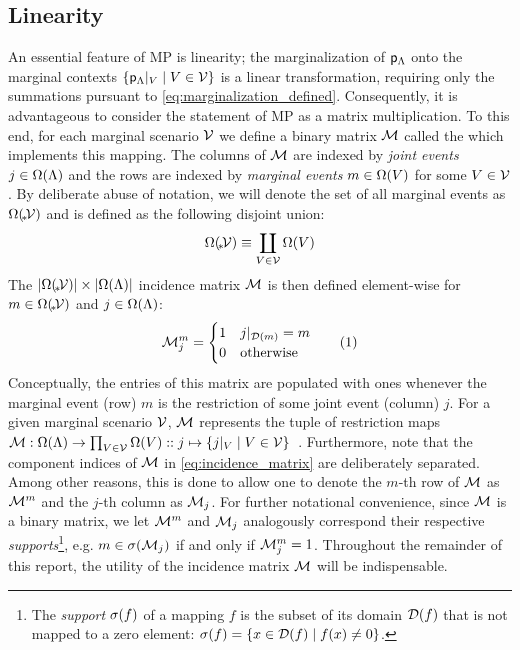 \documentclass[aps, 10pt, english, twoside, twocolumn, pra, nofootinbib, tightenlines, longbibliography, superscriptaddress]{revtex4-1}
\begin{document}
    \subsection{Linearity}
    An essential feature of MP is linearity; the marginalization of ${\mathsf{p}}_{\Lambda}$ onto the marginal contexts $\bc{\restrict{\prob{\jointvar}}{V} \mid V \in \mscenario}$ is a linear transformation, requiring only the summations pursuant to \cref{eq:marginalization_defined}. Consequently, it is advantageous to consider the statement of MP as a matrix multiplication. To this end, for each marginal scenario $\mathcal{V}$ we define a binary matrix $\mathcal{M}$ called the  which implements this mapping. The columns of $\mathcal{M}$ are indexed by \textit{joint events} $j \in \events{\jointvar}$ and the rows are indexed by \textit{marginal events} $m \in \events{V}$ for some $V \in \mathcal{V}$. By deliberate abuse of notation, we will denote the set of all marginal events as $\events{\mscenariowrap}$ and is defined as the following disjoint union:
    \[ \events{\mscenariowrap} \defined \coprod_{V \in \mscenario} \events{V} \]
    The $\abs{\events{\mscenariowrap}}\times\abs{\events{\jointvar}}$ incidence matrix $\mathcal{M}$ is then defined element-wise for $m \in \events{\mscenariowrap}$ and $j \in \events{\jointvar}$:
    \[ \incidence^{m}_{j} = \begin{cases}
        1 & \restrict{j}{\domain{m}} = m\\
        0 & \text{otherwise}
    \end{cases} \eq \label{eq:incidence_matrix} \]
    Conceptually, the entries of this matrix are populated with ones whenever the marginal event (row) $m$ is the restriction of some joint event (column) $j$. For a given marginal scenario $\mathcal{V}$, $\mathcal{M}$ represents the tuple of restriction maps $\incidence : \events{\jointvar} \to \prod_{V \in \mscenario} \events{V} :: j \mapsto \bc{\restrict{j}{V} \mid V \in \mscenario}$~\cite{Abramsky_2011}. Furthermore, note that the component indices of $\mathcal{M}$ in \cref{eq:incidence_matrix} are deliberately separated. Among other reasons, this is done to allow one to denote the $m$-th row of $\mathcal{M}$ as $\mathcal{M}^{m}$ and the $j$-th column as $\mathcal{M}_{j}$. For further notational convenience, since $\mathcal{M}$ is a binary matrix, we let $\mathcal{M}^{m}$ and $\mathcal{M}_{j}$ analogously correspond their respective \textit{supports}\footnote{The \textit{support} $\supp{f}$ of a mapping $f$ is the subset of its domain $\domain{f}$ that is not mapped to a zero element: $\supp{f} = \bc{x \in \domain{f} \mid f\br{x} \neq 0}$.}, e.g. $m \in \supp{\incidence_{j}}$ if and only if $\mathcal{M}_{j}^{m} = 1$. Throughout the remainder of this report, the utility of the incidence matrix $\mathcal{M}$ will be indispensable.
\end{document}
